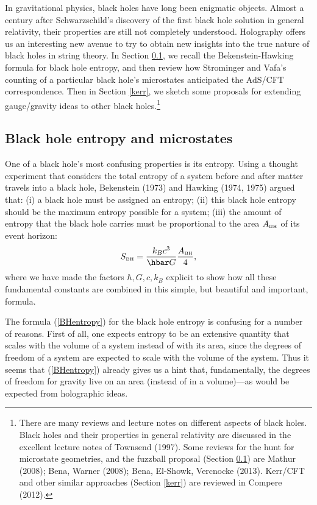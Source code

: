 \documentclass[12pt]{article}
\def\be{\begin{equation}}
\def\ee{\end{equation}}
\renewcommand{\^}[1]{\hat{#1}}
\newcommand{\tn}[1]{\mbox{\tiny #1}}
\begin{document}
In gravitational physics, black holes have long been enigmatic objects. Almost a century after Schwarzschild's discovery of the first black hole solution in general relativity, their properties are still not completely understood. Holography offers us an interesting new avenue to try to obtain new insights into the true  nature of black holes in string theory. In Section \ref{BHmicro}, we recall the Bekenstein-Hawking formula for black hole entropy, and then review how Strominger and Vafa's counting of a particular black hole's microstates anticipated the AdS/CFT correspondence. Then in Section \ref{kerr}, we sketch some proposals for extending gauge/gravity ideas to other black holes.\footnote{There are many reviews and lecture notes on different aspects of black holes. Black holes and their properties in general relativity are discussed in the excellent lecture notes of Townsend (1997). Some reviews for the hunt for microstate geometries, and the fuzzball proposal (Section \ref{BHmicro}) are Mathur (2008); Bena, Warner (2008); Bena, El-Showk, Vercnocke (2013). Kerr/CFT and other similar approaches (Section \ref{kerr}) are reviewed in Compere (2012).}


\subsection{Black hole entropy and microstates}\label{BHmicro}
One of a black hole's most confusing properties is its entropy. Using a thought experiment that considers the total entropy of a system before and after matter travels into a black hole, Bekenstein (1973) and Hawking (1974, 1975) argued that: (i) a black hole must be assigned an entropy; (ii) this black hole entropy should be the maximum entropy possible for a system; (iii) the amount of entropy that the black hole carries must be proportional to the area $A_{\tn{BH}}$ of its event horizon:
\be \label{BHentropy} S_{\tn{BH}} = \frac{k_B c^3}{\hbar G} \frac{A_{\tn{BH}}}{4},\ee
where we have made the factors $\hbar, G, c, k_B$  explicit to show how all these fundamental constants are combined in this simple, but beautiful and important, formula.

The formula (\ref{BHentropy}) for the black hole entropy is confusing for a number of reasons. First of all, one expects entropy to be an extensive quantity that scales with the volume of a system instead of with its area, since the degrees of freedom of a system are expected to scale with the volume of the system. Thus it seems that (\ref{BHentropy}) already gives us a hint that, fundamentally, the degrees of freedom for gravity live on an area (instead of in a volume)---as would be expected from holographic ideas.
                                                                                                                               
\end{document}
